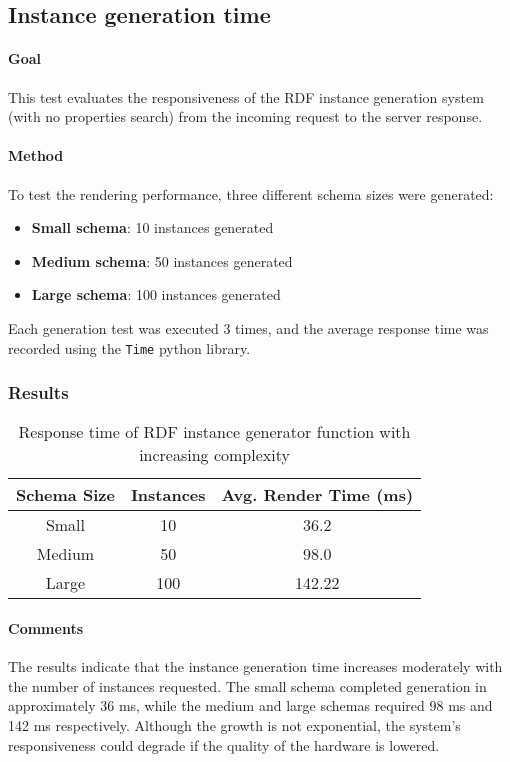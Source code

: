 \subsection{Instance generation time}

\paragraph{Goal}
This test evaluates the responsiveness of the RDF instance generation system (with no properties search) from the incoming request to the server response.

\paragraph{Method}
To test the rendering performance, three different schema sizes were generated:
\begin{itemize}
    \item \textbf{Small schema}: 10 instances generated
    \item \textbf{Medium schema}: 50 instances generated
    \item \textbf{Large schema}: 100 instances generated
\end{itemize}

Each generation test was executed 3 times, and the average response time was recorded using the \texttt{Time} python library.

\subsubsection{Results}

\begin{table}[H]
\centering
\begin{tabular}{|c|c|c|}
\hline
\textbf{Schema Size} & \textbf{Instances} & \textbf{Avg. Render Time (ms)} \\ \hline
Small & 10 & 36.2 \\ \hline
Medium & 50 & 98.0 \\ \hline
Large & 100 & 142.22 \\ \hline
\end{tabular}
\caption{Response time of RDF instance generator function with increasing complexity}
\label{tab:rendering-times}
\end{table}

\paragraph{Comments}
The results indicate that the instance generation time increases moderately with the number of instances requested. The small schema completed generation in approximately 36 ms, while the medium and large schemas required 98 ms and 142 ms respectively. Although the growth is not exponential, the system's responsiveness could degrade if the quality of the hardware is lowered.

